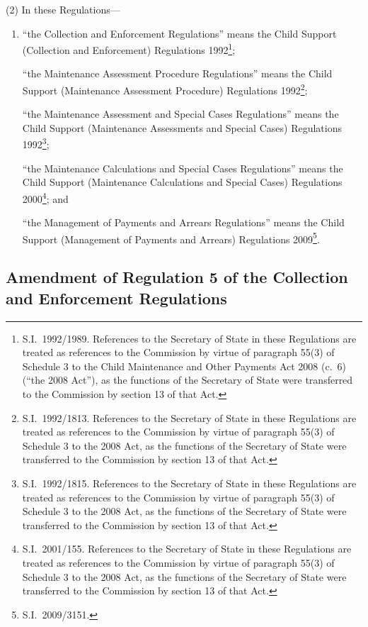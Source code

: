 \documentclass[12pt,a4paper]{article}
\begin{document}
(2) In these Regulations—
\begin{enumerate}\item[]
“the Collection and Enforcement Regulations” means the Child Support (Collection and Enforcement) Regulations 1992\footnote{S.I.~1992/1989. References to the Secretary of State in these Regulations are treated as references to the Commission by virtue of paragraph 55(3) of Schedule 3 to the Child Maintenance and Other Payments Act 2008 (c.~6) (“the 2008 Act”), as the functions of the Secretary of State were transferred to the Commission by section 13 of that Act.};

“the Maintenance Assessment Procedure Regulations” means the Child Support (Maintenance Assessment Procedure) Regulations 1992\footnote{S.I.~1992/1813. References to the Secretary of State in these Regulations are treated as references to the Commission by virtue of paragraph 55(3) of Schedule 3 to the 2008 Act, as the functions of the Secretary of State were transferred to the Commission by section 13 of that Act.};

“the Maintenance Assessment and Special Cases Regulations” means the Child Support (Maintenance Assessments and Special Cases) Regulations 1992\footnote{S.I.~1992/1815. References to the Secretary of State in these Regulations are treated as references to the Commission by virtue of paragraph 55(3) of Schedule 3 to the 2008 Act, as the functions of the Secretary of State were transferred to the Commission by section 13 of that Act.};

“the Maintenance Calculations and Special Cases Regulations” means the Child Support (Maintenance Calculations and Special Cases) Regulations 2000\footnote{S.I.~2001/155. References to the Secretary of State in these Regulations are treated as references to the Commission by virtue of paragraph 55(3) of Schedule 3 to the 2008 Act, as the functions of the Secretary of State were transferred to the Commission by section 13 of that Act.}; and

“the Management of Payments and Arrears Regulations” means the Child Support (Management of Payments and Arrears) Regulations 2009\footnote{S.I.~2009/3151.}.
\end{enumerate}

\subsection[2. Amendment of Regulation 5 of the Collection and Enforcement Regulations]{Amendment of Regulation 5 of the Collection and Enforcement Regulations}
\end{document}
